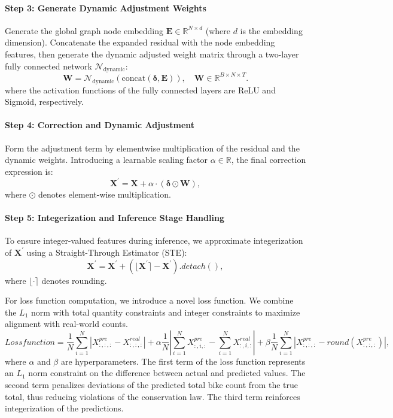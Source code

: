 \documentclass[preprint,12pt,authoryear]{elsarticle}
\begin{document}
\paragraph{Step 3: Generate Dynamic Adjustment Weights}
Generate the global graph node embedding $\mathbf{E} \in \mathbb{R}^{N \times d}$ (where $d$ is the embedding dimension). Concatenate the expanded residual with the node embedding features, then generate the dynamic adjusted weight matrix through a two-layer fully connected network $\mathcal{N}_\text{dynamic}$:
\begin{equation}
\mathbf{W} = \mathcal{N}_\text{dynamic}(\text{concat}(\bm{\delta}, \mathbf{E})), \quad \mathbf{W} \in \mathbb{R}^{B \times N \times T}.
\end{equation}
where the activation functions of the fully connected layers are ReLU and Sigmoid, respectively.
\paragraph{Step 4: Correction and Dynamic Adjustment}
Form the adjustment term by elementwise multiplication of the residual and the dynamic weights. Introducing a learnable scaling factor $\alpha \in \mathbb{R}$, the final correction expression is:
\begin{equation}
\mathbf{X}^\prime = \mathbf{X} + \alpha \cdot \left( \bm{\delta}\odot \mathbf{W} \right),
\end{equation}
where $\odot$ denotes element-wise multiplication.
\paragraph{Step 5: Integerization and Inference Stage Handling}
To ensure integer-valued features during inference, we approximate integerization of $\mathbf{X}^\prime$ using a Straight-Through Estimator (STE):
\begin{equation}
\mathbf{X}^\prime = \mathbf{X}^\prime + (\lfloor \mathbf{X}^\prime \rceil - \mathbf{X}^\prime).detach(),
\end{equation}
where $\lfloor \cdot \rceil$ denotes rounding.

For loss function computation, we introduce a novel loss function. We combine the $L_1$ norm with total quantity constraints and integer constraints to maximize alignment with real-world counts.
\begin{equation}
Loss function = \frac{1}{N}  \sum_{i=1}^N |X^{pre}_{:, :, :}-X^{real}_{:, :, :}|+\alpha\frac{1}{N}|\sum_{i=1}^N X^{pre}_{:, i, :} - \sum_{i=1}^N X^{real}_{:, i, :} |+\beta \frac{1}{N} \sum_{i=1}^N |X^{pre}_{:, :, :}-round(X^{pre}_{:, :, :})|,
\end{equation}
where $\alpha$ and $\beta$ are hyperparameters. The first term of the loss function represents an $L_1$ norm constraint on the difference between actual and predicted values. The second term penalizes deviations of the predicted total bike count from the true total, thus reducing violations of the conservation law. The third term reinforces integerization of the predictions.
\end{document}
